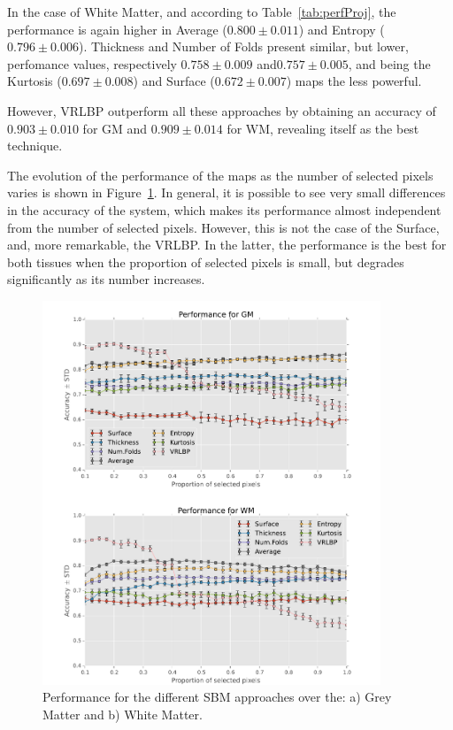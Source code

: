 In the case of White Matter, and according to Table~\ref{tab:perfProj}, the performance is again higher in Average ($0.800 \pm 0.011$) and Entropy ($0.796 \pm 0.006$). Thickness and Number of Folds present similar, but lower, perfomance values, respectively $0.758 \pm 0.009$ and$0.757 \pm 0.005$, and being the Kurtosis ($0.697 \pm 0.008$) and Surface ($0.672 \pm 0.007$) maps the less powerful. 

However, VRLBP outperform all these approaches by obtaining an accuracy of $0.903 \pm 0.010$ for \ac{GM} and $0.909 \pm 0.014$ for \ac{WM}, revealing itself as the best technique. 

The evolution of the performance of the maps as the number of selected pixels varies is shown in Figure~\ref{fig:figureGM}. In general, it is possible to see very small differences in the accuracy of the system, which makes its performance almost independent from the number of selected pixels. However, this is not the case of the Surface, and, more remarkable, the VRLBP. In the latter, the performance is the best for both tissues when the proportion of selected pixels is small, but degrades significantly as its number increases. 

\begin{figure}[htp]
	\centering
	\includegraphics[width=0.9\textwidth]{gfx/ch6/10-comparisonPerformance}
	\caption{Performance for the different \ac{SBM} approaches over the: a) Grey Matter and b) White Matter.}
	\label{fig:figureGM}
\end{figure}


